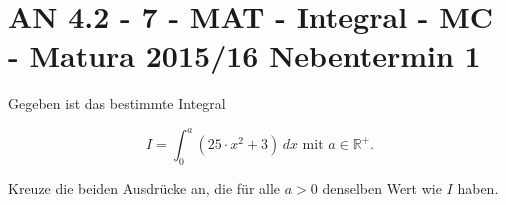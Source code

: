 \section{AN 4.2 - 7 - MAT - Integral - MC - Matura 2015/16 Nebentermin 1}

\begin{beispiel}[AN 4.2]{1} %
Gegeben ist das bestimmte Integral

$$I=\int_{0}^{a}(25\cdot x^2+3)\,dx \text{ mit }a\in \mathbb{R}^+.$$

Kreuze die beiden Ausdrücke an, die für alle $a>0$ denselben Wert wie $I$ haben.

\end{beispiel}
